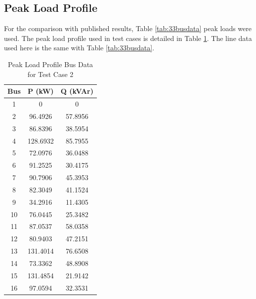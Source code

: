 \documentclass[12pt]{article}
\begin{document}
	\subsection{Peak Load Profile}
	For the comparison with published results, Table \ref{tab:33busdata} peak loads were used. The peak load profile used in test cases is detailed in Table \ref{tab:peakloadcase2}. The line data used here is the same with Table \ref{tab:33busdata}.
	
	
	\begin{table}[htbp]
		\centering
		\caption{Peak Load Profile Bus Data for Test Case 2}
		\vspace{10pt}
		\label{tab:peakloadcase2}
		\small %
		\setlength{\tabcolsep}{4pt} %
			\begin{tabular}{|c|c|c|}
				\hline
				\textbf{Bus} & \textbf{P (kW)} & \textbf{Q (kVAr)} \\ \hline
				1            & 0               & 0                 \\ \hline
				2            & 96.4926         & 57.8956           \\ \hline
				3            & 86.8396         & 38.5954           \\ \hline
				4            & 128.6932        & 85.7955           \\ \hline
				5            & 72.0976         & 36.0488           \\ \hline
				6            & 91.2525         & 30.4175           \\ \hline
				7            & 90.7906         & 45.3953           \\ \hline
				8            & 82.3049         & 41.1524           \\ \hline
				9            & 34.2916         & 11.4305           \\ \hline
				10           & 76.0445         & 25.3482           \\ \hline
				11           & 87.0537         & 58.0358           \\ \hline
				12           & 80.9403         & 47.2151           \\ \hline
				13           & 131.4014        & 76.6508           \\ \hline
				14           & 73.3362         & 48.8908           \\ \hline
				15           & 131.4854        & 21.9142           \\ \hline
				16           & 97.0594         & 32.3531           \\ \hline

\end{tabular}
\end{table}
\end{document}
